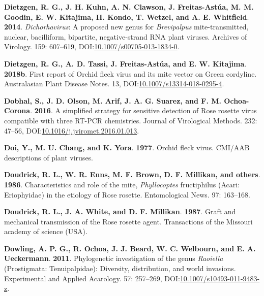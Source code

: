 \documentclass[12pt,final,CPage]{ufthesis}
\newlength{\cslhangindent}
\newenvironment{CSLReferences}[2] %
{%
	\setlength{\parindent}{0pt}
	\ifodd #1 \everypar{\setlength{\hangindent}{\cslhangindent}}\ignorespaces\fi
	\ifnum #2 > 0
	\setlength{\parskip}{#2\baselineskip}
	\fi
}%
{}
\begin{document}
{\begin{CSLReferences}{1}{0}
  \leavevmode{}%
  \textbf{Dietzgen, R. G., J. H. Kuhn, A. N. Clawson, J. Freitas-Astúa, M. M. Goodin, E. W. Kitajima, H. Kondo, T. Wetzel, and A. E. Whitfield}. \textbf{2014}. {\emph{Dichorhavirus}}: A proposed new genus for {\emph{Brevipalpus}} mite-transmitted, nuclear, bacilliform, bipartite, negative-strand {RNA} plant viruses. Archives of Virology. 159: 607--619, DOI:\href{https://doi.org/10.1007/s00705-013-1834-0}{10.1007/s00705-013-1834-0}.

  \leavevmode{}%
  \textbf{Dietzgen, R. G., A. D. Tassi, J. Freitas-Astúa, and E. W. Kitajima}. \textbf{2018b}. First report of {Orchid fleck virus} and its mite vector on {Green cordyline}. Australasian Plant Disease Notes. 13, DOI:\href{https://doi.org/10.1007/s13314-018-0295-4}{10.1007/s13314-018-0295-4}.

  \leavevmode{}%
  \textbf{Dobhal, S., J. D. Olson, M. Arif, J. A. G. Suarez, and F. M. Ochoa-Corona}. \textbf{2016}. A simplified strategy for sensitive detection of {Rose rosette virus} compatible with three {RT}-{PCR} chemistries. Journal of Virological Methods. 232: 47--56, DOI:\href{https://doi.org/10.1016/j.jviromet.2016.01.013}{10.1016/j.jviromet.2016.01.013}.

  \leavevmode{}%
  \textbf{Doi, Y., M. U. Chang, and K. Yora}. \textbf{1977}. Orchid fleck virus. {CMI/AAB} descriptions of plant viruses.

  \leavevmode{}%
  \textbf{Doudrick, R. L., W. R. Enns, M. F. Brown, D. F. Millikan, and others}. \textbf{1986}. Characteristics and role of the mite, {\emph{Phyllocoptes} fructiphilus} ({Acari}: {Eriophyidae}) in the etiology of {Rose rosette}. Entomological News. 97: 163--168.

  \leavevmode{}%
  \textbf{Doudrick, R. L., J. A. White, and D. F. Millikan}. \textbf{1987}. Graft and mechanical transmission of the {Rose rosette} agent. Transactions of the {Missouri} academy of science {(USA)}.

  \leavevmode{}%
  \textbf{Dowling, A. P. G., R. Ochoa, J. J. Beard, W. C. Welbourn, and E. A. Ueckermann}. \textbf{2011}. Phylogenetic investigation of the genus {\emph{Raoiella}} ({Prostigmata}: {Tenuipalpidae}): Diversity, distribution, and world invasions. Experimental and Applied Acarology. 57: 257--269, DOI:\href{https://doi.org/10.1007/s10493-011-9483-z}{10.1007/s10493-011-9483-z}.


\end{CSLReferences}}
\end{document}
